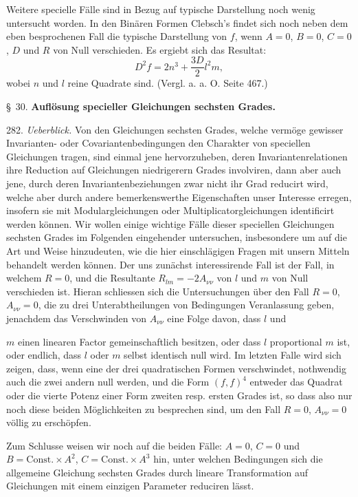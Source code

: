 Weitere specielle Fälle sind in Bezug auf typische Darstellung noch wenig untersucht worden. In den \glqq Binären Formen\grqq{} Clebsch's findet sich noch neben dem eben besprochenen Fall die typische Darstellung von $f$, wenn $A=0$, $B=0$, $C=0$, $D$ und $R$ von Null verschieden. Es ergiebt sich das Resultat:
\[
D^2f=2n^3+\frac{3D}{2}l^2m,
\]
wobei $n$ und $l$ reine Quadrate sind. (Vergl. a. a. O. Seite 467.)

\begin{center}
\S\ 30. \textbf{Auflösung specieller Gleichungen sechsten Grades.}
\end{center}

282. \textit{Ueberblick.} Von den Gleichungen sechsten Grades, welche vermöge gewisser Invarianten- oder Covariantenbedingungen den Charakter von speciellen Gleichungen tragen, sind einmal jene hervorzuheben, deren Invariantenrelationen ihre Reduction auf Gleichungen niedrigerern Grades involviren, dann aber auch jene, durch deren Invariantenbeziehungen zwar nicht ihr Grad reducirt wird, welche aber durch andere bemerkenswerthe Eigenschaften unser Interesse erregen, insofern sie mit Modulargleichungen oder Multiplicatorgleichungen identificirt werden können. Wir wollen einige wichtige Fälle dieser speciellen Gleichungen sechsten Grades im Folgenden eingehender untersuchen, insbesondere um auf die Art und Weise hinzudeuten, wie die hier einschlägigen Fragen mit unsern Mitteln behandelt werden können. Der uns zunächst interessirende Fall ist der Fall, in welchem $R=0$, und die Resultante $R_{lm}=-2A_{\nu\nu}$ von $l$ und $m$ von Null verschieden ist. Hieran schliessen sich die Untersuchungen über den Fall $R=0$, $A_{\nu\nu}=0$, die zu drei Unterabtheilungen von Bedingungen Veranlassung geben, jenachdem das Verschwinden von $A_{\nu\nu}$ eine Folge davon, dass $l$ und


$m$ einen linearen Factor gemeinschaftlich besitzen, oder dass $l$ proportional $m$ ist, oder endlich, dass $l$ oder $m$ selbst identisch null wird. Im letzten Falle wird sich zeigen, dass, wenn eine der drei quadratischen Formen verschwindet, nothwendig auch die zwei andern null werden, und die Form $(f,f)^4$ entweder das Quadrat oder die vierte Potenz einer Form zweiten resp. ersten Grades ist, so dass also nur noch diese beiden Möglichkeiten zu besprechen sind, um den Fall $R=0$, $A_{\nu\nu}=0$ völlig zu erschöpfen.

Zum Schlusse weisen wir noch auf die beiden Fälle: $A=0$, $C=0$ und $B=\text{Const.}\times A^2$, $C=\text{Const.}\times A^3$ hin, unter welchen Bedingungen sich die allgemeine Gleichung sechsten Grades durch lineare Transformation auf Gleichungen mit einem einzigen Parameter reduciren lässt.

